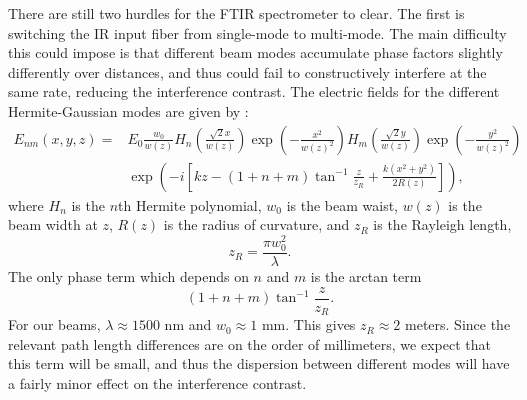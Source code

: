 \documentclass[12pt]{report}
\begin{document}
There are still two hurdles for the FTIR spectrometer to clear. The first is switching the IR input fiber from single-mode to multi-mode. The main difficulty this could impose is that different beam modes accumulate phase factors slightly differently over distances, and thus could fail to constructively interfere at the same rate, reducing the interference contrast. The electric fields for the different Hermite-Gaussian modes are given by \cite{RP}:
\begin{align}\label{eq:12}
  E_{nm}(x,y,z) =& E_{0}\frac{w_{0}}{w(z)}
  H_{n}\left(\frac{\sqrt{2}x}{w(z)}\right)\exp\left(-\frac{x^{2}}{w(z)^{2}}\right)
  H_{m}\left(\frac{\sqrt{2}y}{w(z)}\right)\exp\left(-\frac{y^{2}}{w(z)^{2}}\right)
 \nonumber \\ &\exp\left(-i\left[kz-(1+n+m)\tan^{-1}\frac{z}{z_{R}}+\frac{k(x^{2}+y^{2})}{2R(z)}\right]\right),
\end{align}
where $H_{n}$ is the $n$th Hermite polynomial, $w_{0}$ is the beam waist, $w(z)$ is the beam width at $z$, $R(z)$ is the radius of curvature, and $z_{R}$ is the Rayleigh length,
\begin{equation}\label{eq:13}
z_{R} = \frac{\pi w_{0}^{2}}{\lambda}.
\end{equation}
The only phase term which depends on $n$ and $m$ is the arctan term
\begin{equation}\label{eq:14}
(1+n+m)\tan^{-1}\frac{z}{z_{R}}.
\end{equation}
For our beams, $\lambda \approx 1500$ nm and $w_{0} \approx 1$ mm. This gives $z_{R}\approx 2$ meters. Since the relevant path length differences are on the order of millimeters, we expect that this term will be small, and thus the dispersion between different modes will have a fairly minor effect on the interference contrast.
\end{document}
